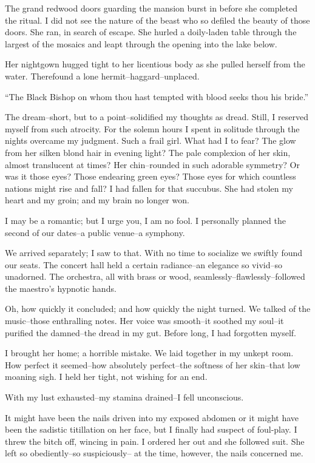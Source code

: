 \documentclass{article}
\begin{document}
\noindent %
The grand redwood doors guarding the mansion burst in
before she completed the ritual.
I did not see the nature of the beast who so defiled the
beauty of those doors.
She ran, in search of escape.
She hurled a doily-laden table through the largest
of the mosaics and leapt through the opening
into the lake below.


Her nightgown hugged tight to her licentious body
as she pulled herself from the water.
Therefound a lone hermit--haggard--unplaced.


``The Black Bishop on whom thou hast tempted
with blood seeks thou his bride.''
\vvvv


\noindent
The dream--short, but to a point--solidified my thoughts as dread.
Still, I reserved myself from such atrocity.
For the solemn hours I spent in solitude through the nights
overcame my judgment.
Such a frail girl.
What had I to fear?
The glow from her silken blond hair in evening light?
The pale complexion of her skin, almost translucent at times?
Her chin--rounded in such adorable symmetry?
Or was it those eyes? Those endearing green eyes?
Those eyes for which countless nations might rise and fall?
I had fallen for that succubus.
She had stolen my heart and my groin;
and my brain no longer won.
\VV


\noindent
I may be a romantic; but I urge you, I am no fool.
I personally planned the second of our dates--a public venue--a symphony.


We arrived separately; I saw to that.
With no time to socialize we swiftly found our seats.
The concert hall held a certain radiance--an elegance
so vivid--so unadorned.
The orchestra, all with brass or wood, seamlessly--flawlessly--followed
the maestro's hypnotic hands.


Oh, how quickly it concluded; and how quickly the night turned.
We talked of the music--those enthralling notes.
Her voice was smooth--it soothed my soul--it purified
the damned--the dread in my gut.
Before long, I had forgotten myself.


I brought her home; a horrible mistake.
We laid together in my unkept room.
How perfect it seemed--how
absolutely perfect--the
softness of her skin--that
low moaning sigh.
I held her tight, not wishing for an end.
\VV


\noindent
With my lust exhausted--my stamina drained--I fell unconscious.
\VV


\noindent
It might have been the nails driven into my exposed abdomen
or it might have been the sadistic titillation on her face,
but I finally had suspect of foul-play.
I threw the bitch off, wincing in pain.
I ordered her out and she followed suit.
She left so obediently--so suspiciously--
at the time, however, the nails concerned me.
\end{document}
